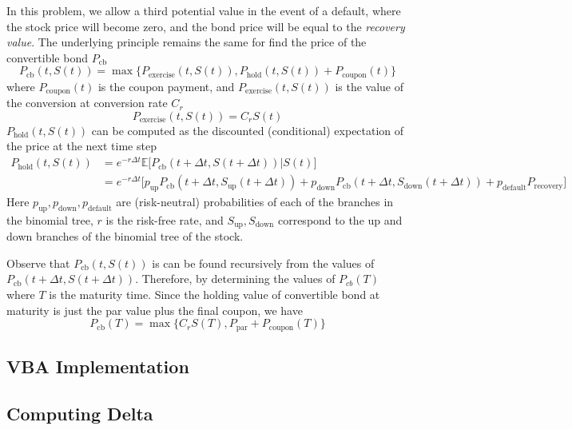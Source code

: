 \documentclass[11pt]{article}
\theoremstyle{definition}
\begin{document}
In this problem, we allow a third potential value 
in the event of a default, where the stock price 
will become zero, and the bond price will be equal to 
the \emph{recovery value}.
The underlying principle remains the same
for find the price of the convertible bond $P_\text{cb}$
%
\begin{equation*}
  P_\text{cb}(t,S(t)) = \max\Big\{P_\text{exercise}(t,S(t)), 
                        P_\text{hold}(t,S(t)) + 
                        P_\text{coupon}(t)\Big\}
\end{equation*}
%
where $P_\text{coupon}(t)$ is the coupon payment,
and $P_\text{exercise}(t,S(t))$ is the value of the conversion
at conversion rate $C_r$
%
\begin{equation*}
  P_\text{exercise}(t,S(t)) = C_r S(t)
\end{equation*}
%
$P_\text{hold}(t,S(t))$ can be computed as the 
discounted (conditional) expectation of 
the price at the next time step
%
\begin{equation*}
\begin{aligned}
  P_\text{hold}(t,S(t)) &= e^{-r\Delta t} 
    \mathbb{E}\Big[P_\text{cb}(t+\Delta t,S(t+\Delta t)) \Big| S(t)\Big] \\
  &= e^{-r\Delta t} \Big[p_\text{up} 
    P_\text{cb}(t+\Delta t,S_\text{up}(t+\Delta t)) + 
    p_\text{down} P_\text{cb}(t+\Delta t,S_\text{down}(t+\Delta t)) + 
    p_\text{default} P_\text{recovery}]
\end{aligned}
\end{equation*}
%
Here $p_\text{up}, p_\text{down}, p_\text{default}$
are (risk-neutral) probabilities of each of the branches
in the binomial tree, $r$ is the risk-free rate,
and $S_\text{up}, S_\text{down}$ correspond to 
the up and down branches of the binomial tree of the stock.

Observe that $P_\text{cb}(t,S(t))$ is can be found recursively
from the values of $P_\text{cb}(t+\Delta t,S(t+\Delta t))$.
Therefore, by determining the values of $P_{cb}(T)$ 
where $T$ is the maturity time.
Since the holding value of convertible bond at maturity
is just the par value plus the final coupon, we have
%
\begin{equation*}
  P_\text{cb}(T) = \max\Big\{C_r S(T), P_\text{par} + 
                    P_\text{coupon}(T)\Big\}
\end{equation*}


\subsection{VBA Implementation}

\subsection{Computing Delta}
\end{document}

